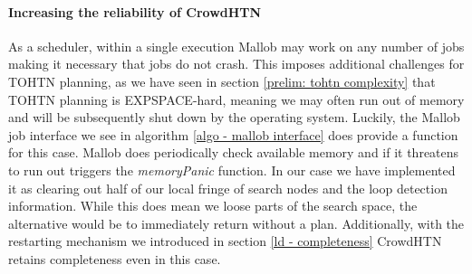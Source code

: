 \paragraph{Increasing the reliability of CrowdHTN}
As a scheduler, within a single execution Mallob may work on any number of jobs making it necessary that jobs do not crash. This imposes additional challenges for TOHTN planning, as we have seen in section \ref{prelim: tohtn complexity} that TOHTN planning is EXPSPACE-hard, meaning we may often run out of memory and will be subsequently shut down by the operating system. Luckily, the Mallob job interface we see in algorithm \ref{algo - mallob interface} does provide a function for this case. Mallob does periodically check available memory and if it threatens to run out triggers the \textit{memoryPanic} function. In our case we have implemented it as clearing out half of our local fringe of search nodes and the loop detection information. While this does mean we loose parts of the search space, the alternative would be to immediately return without a plan. Additionally, with the restarting mechanism we introduced in section \ref{ld - completeness} CrowdHTN retains completeness even in this case.

